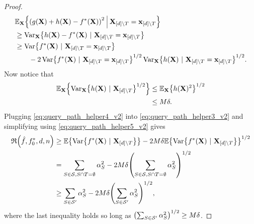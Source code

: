 \documentclass[11pt]{article}
\newcommand{\bx}{\mathbf{x}}
\newcommand{\bX}{\mathbf{X}}
\DeclarePairedDelimiter{\braces}{\lbrace}{\rbrace}
\DeclarePairedDelimiter{\paren}{(}{)}
\newcommand{\E}{\mathbb{E}}
\newcommand{\indicator}{\mathbb{1}}
\newcommand{\Var}{\operatorname{Var}}
\newcommand{\nfeats}{d}
\newcommand{\nsamples}{n}
\newcommand{\coordindices}{[\nfeats]}
\newcommand{\data}[1][n]{\mathcal{D}_{#1}}
\newcommand{\traversal}{T}
\newcommand{\fcoefs}{\mathcal{S}}
\newcommand{\objective}{\mathfrak{R}}
\newcommand{\ybound}{M}
\begin{document}
\begin{proof}
\begin{equation}
\begin{split}
            & \E_{\bX}\braces*{\paren*{g(\bX) + h(\bX) - f^*(\bX)}^2~\vline~ \bX_{\coordindices\backslash\traversal}=\bx_{\coordindices\backslash\traversal}} \\
            & \geq \Var_{\bX}\braces*{h(\bX) - f^*(\bX)~|~\bX_{\coordindices\backslash\traversal}=\bx_{\coordindices\backslash\traversal}} \\
            & \geq \Var\braces*{f^*(\bX)~|~\bX_{\coordindices\backslash\traversal} = \bx_{\coordindices\backslash\traversal}} \\
            &\quad\quad- 2\Var\braces*{f^*(\bX)~|~\bX_{\coordindices\backslash\traversal} = \bx_{\coordindices\backslash\traversal}}^{1/2}\Var_{\bX}\braces*{h(\bX)~|~\bX_{\coordindices\backslash\traversal}=\bx_{\coordindices\backslash\traversal}}^{1/2}.
        \end{split}
    \end{equation}
    Now notice that
    \begin{equation}
    \label{eq:query_path_helper5_v2}
    \begin{split}
         \E_{\bX}\braces*{\Var_{\bX}\braces*{h(\bX)~|~\bX_{\coordindices\backslash\traversal}}^{1/2}}
         & \leq \E_{\bX}\braces*{h(\bX)^2}^{1/2} \\
         & \leq \ybound\delta.
    \end{split}
    \end{equation}
    Plugging \eqref{eq:query_path_helper4_v2} into \eqref{eq:query_path_helper3_v2} and simplifying using \eqref{eq:query_path_helper5_v2} gives
    \begin{equation}
    \begin{split}
        \objective\paren*{\hat f, f^*_0,\nfeats,\nsamples} & \geq \E\braces*{\Var\braces*{f^*(\bX)~|~\bX_{\coordindices\backslash\traversal}}} - 2M\delta\E\braces*{\Var\braces*{f^*(\bX)~|~\bX_{\coordindices\backslash\traversal}}}^{1/2} \\
        & = \sum_{S \in \fcoefs, S\cap\traversal = \emptyset} \alpha_S^2 - 2M\delta\paren*{\sum_{S \in \fcoefs, S\cap\traversal = \emptyset} \alpha_S^2}^{1/2} \\
        & \geq \sum_{S \in \fcoefs'} \alpha_S^2 - 2M\delta\paren*{\sum_{S \in \fcoefs'} \alpha_S^2}^{1/2},
    \end{split}
    \end{equation}    
    where the last inequality holds so long as $\paren*{\sum_{S \in \fcoefs'} \alpha_S^2}^{1/2} \geq M\delta$.
\end{proof}
\end{document}

